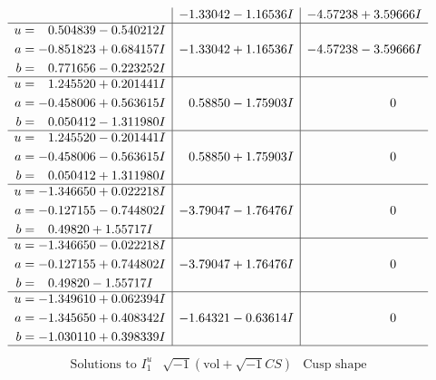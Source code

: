 \documentclass[1p]{elsarticle_modified}
\theoremstyle{definition}
\newcommand{\I}{\sqrt{-1}}
\begin{document}
$$\begin{array}{c|c|c}
 & -1.33042 - 1.16536 I & -4.57238 + 3.59666 I \\ \hline\begin{aligned}
u &= \phantom{-}0.504839 - 0.540212 I \\
a &= -0.851823 + 0.684157 I \\
b &= \phantom{-}0.771656 - 0.223252 I\end{aligned}
 & -1.33042 + 1.16536 I & -4.57238 - 3.59666 I \\ \hline\begin{aligned}
u &= \phantom{-}1.245520 + 0.201441 I \\
a &= -0.458006 + 0.563615 I \\
b &= \phantom{-}0.050412 - 1.311980 I\end{aligned}
 & \phantom{-}0.58850 - 1.75903 I & \phantom{-0.000000 } 0 \\ \hline\begin{aligned}
u &= \phantom{-}1.245520 - 0.201441 I \\
a &= -0.458006 - 0.563615 I \\
b &= \phantom{-}0.050412 + 1.311980 I\end{aligned}
 & \phantom{-}0.58850 + 1.75903 I & \phantom{-0.000000 } 0 \\ \hline\begin{aligned}
u &= -1.346650 + 0.022218 I \\
a &= -0.127155 - 0.744802 I \\
b &= \phantom{-}0.49820 + 1.55717 I\end{aligned}
 & -3.79047 - 1.76476 I & \phantom{-0.000000 } 0 \\ \hline\begin{aligned}
u &= -1.346650 - 0.022218 I \\
a &= -0.127155 + 0.744802 I \\
b &= \phantom{-}0.49820 - 1.55717 I\end{aligned}
 & -3.79047 + 1.76476 I & \phantom{-0.000000 } 0 \\ \hline\begin{aligned}
u &= -1.349610 + 0.062394 I \\
a &= -1.345650 + 0.408342 I \\
b &= -1.030110 + 0.398339 I\end{aligned}
 & -1.64321 - 0.63614 I & \phantom{-0.000000 } 0\\
 \hline 
 \end{array}$$\newpage$$\begin{array}{c|c|c}  
\text{Solutions to }I^u_{1}& \I (\text{vol} + \sqrt{-1}CS) & \text{Cusp shape}\\

\end{array}$$
\end{document}
